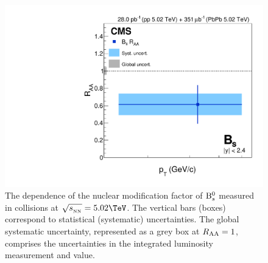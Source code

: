  
\begin{figure}[tb]
\centering
\includegraphics[width=\cmsFigWidth]{plots/canvasRAAPbPb_0_100.pdf}
\caption{The \pt dependence of the nuclear modification factor \RAA of ${\mathrm{B}_{s}^{0}}$ measured in \PbPb collisions at $\sqrtsNN=5.02\TeV$. The vertical bars (boxes) correspond to statistical (systematic) uncertainties.
The global systematic uncertainty, represented as a grey box at $R_{\mathrm{AA}}=1$, comprises the uncertainties in the integrated luminosity measurement and \TAA value. }
\label{fig:rpaall}
\end{figure}



